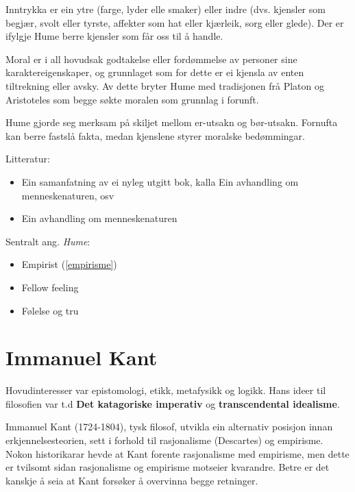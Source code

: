 \documentclass[a4paper]{IEEEtran}
\begin{document}
Inntrykka er ein ytre (farge, lyder elle smaker) eller indre (dvs. kjensler som begjær, svolt eller tyrste, affekter som hat eller kjærleik, sorg eller glede). Der er ifylgje Hume berre kjensler som får oss til å handle.\bigskip

Moral er i all hovudsak godtakelse eller fordømmelse av personer sine karaktereigenskaper, og grunnlaget som for dette er ei kjensla av enten tiltrekning eller avsky. Av dette bryter Hume med tradisjonen frå Platon og Aristoteles som begge søkte moralen som grunnlag i forunft.\bigskip

Hume gjorde seg merksam på skiljet mellom er-utsakn og bør-utsakn. Fornufta kan berre fastslå fakta, medan kjenslene styrer moralske bedømmingar.\bigskip

\begin{center}
Litteratur:
\end{center}
\begin{itemize}\bigskip
    \item Ein samanfatning av ei nyleg utgitt bok, kalla Ein avhandling om menneskenaturen, osv
    \item Ein avhandling om menneskenaturen
\end{itemize}\bigskip 

\begin{center}
Sentralt ang. \textit{Hume}:
\end{center}
\begin{itemize}\bigskip
    \item Empirist (\ref{empirisme})
    \item Fellow feeling
    \item Følelse og tru
\end{itemize}\bigskip


\section{Immanuel Kant}
\label{kant}\bigskip

Hovudinteresser var epistomologi, etikk, metafysikk og logikk. Hans ideer til filosofien var t.d \textbf{Det katagoriske imperativ} og \textbf{transcendental idealisme}.\bigskip

Immanuel Kant (1724-1804), tysk filosof, utvikla ein alternativ posisjon innan erkjennelsesteorien, sett i forhold til rasjonalisme (Descartes) og empirisme. Nokon historikarar hevde at Kant forente rasjonalisme med empirisme, men dette er tvilsomt sidan rasjonalisme og empirisme motseier kvarandre. Betre er det kanskje å seia at Kant forsøker å overvinna begge retninger.\bigskip
\end{document}
